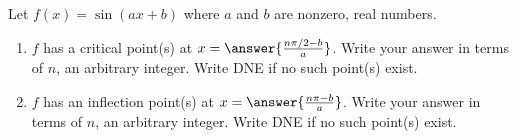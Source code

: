 \documentclass{ximera}
\author{Gregory Hartman \and Matthew Carr}
\begin{document}
\begin{exercise}



Let $f(x)=\sin(ax+b)$  where $a$ and $b$ are nonzero, real numbers. 
\begin{enumerate}
\item		$f$ has a critical point(s) at $x = \answer{\frac{n\pi/2-b}{a}}$. Write your answer in terms of $n$, an arbitrary integer. Write DNE if no such point(s) exist.
\item		$f$ has an inflection point(s) at $x = \answer{\frac{n\pi-b}{a}}$. Write your answer in terms of $n$, an arbitrary integer. Write DNE if no such point(s) exist.

\end{enumerate}

\end{exercise}
\end{document}
